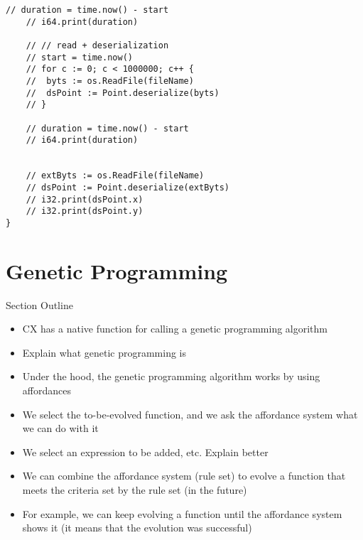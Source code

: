\documentclass[11pt,fleqn,openany]{book} %
\begin{document}
\begin{lstlisting}[caption={Serialization Example},captionpos=b,label={listing:serialization-example}]
	// duration = time.now() - start
	// i64.print(duration)

	// // read + deserialization
	// start = time.now()
	// for c := 0; c < 1000000; c++ {
	// 	byts := os.ReadFile(fileName)
	// 	dsPoint := Point.deserialize(byts)
	// }

	// duration = time.now() - start
	// i64.print(duration)
	
	
	// extByts := os.ReadFile(fileName)
	// dsPoint := Point.deserialize(extByts)
	// i32.print(dsPoint.x)
	// i32.print(dsPoint.y)
}

\end{lstlisting}


\chapter{Genetic Programming}
\label{chapter:genetic-programming}

\begin{remark}
Section Outline
    \begin{itemize}
    	\item CX has a native function for calling a genetic programming algorithm
        \item Explain what genetic programming is
        \item Under the hood, the genetic programming algorithm works by using affordances
        \item We select the to-be-evolved function, and we ask the affordance system what we can do with it
        \item We select an expression to be added, etc. Explain better
        \item We can combine the affordance system (rule set) to evolve a function that meets the criteria set by the rule set (in the future)
        \item For example, we can keep evolving a function until the affordance system shows it (it means that the evolution was successful)
    \end{itemize}
\end{remark}
\end{document}
